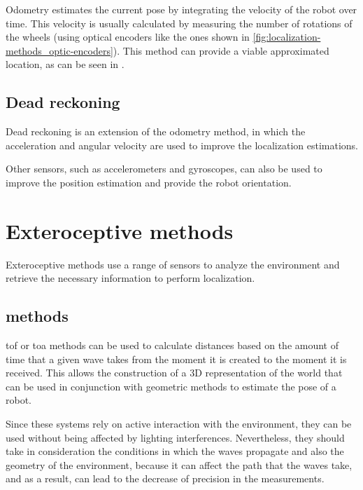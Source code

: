 Odometry estimates the current pose by integrating the velocity of the robot over time. This velocity is usually calculated by measuring the number of rotations of the wheels (using optical encoders like the ones shown in \cref{fig:localization-methods_optic-encoders}). This method can provide a viable approximated location, as can be seen in \cite{Reinstein2013}.


\subsection{Dead reckoning}

Dead reckoning is an extension of the odometry method, in which the acceleration and angular velocity are used to improve the localization estimations.

Other sensors, such as accelerometers and gyroscopes, can also be used to improve the position estimation \cite{Ibraheem2010} and provide the robot orientation.



\section{Exteroceptive methods}

Exteroceptive methods use a range of sensors to analyze the environment and retrieve the necessary information to perform localization.


\subsection{ methods}

\gls{tof} or \gls{toa} methods can be used to calculate distances based on the amount of time that a given wave takes from the moment it is created to the moment it is received. This allows the construction of a 3D representation of the world that can be used in conjunction with geometric methods to estimate the pose of a robot.

Since these systems rely on active interaction with the environment, they can be used without being affected by lighting interferences. Nevertheless, they should take in consideration the conditions in which the waves propagate and also the geometry of the environment, because it can affect the path that the waves take, and as a result, can lead to the decrease of precision in the measurements.

